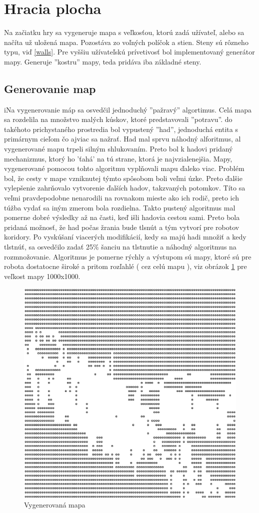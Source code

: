 \section{Hracia plocha} %
Na začiatku hry sa vygeneruje mapa s veľkosťou, ktorú zadá užívateľ, alebo sa načíta už uložená mapa. Pozostáva zo voľných políčok a stien. Steny sú rôzneho typu, viď \ref{walls}. Pre vyššiu užívateľskú prívetivosť bol implementovaný generátor mapy. Generuje ''kostru'' mapy, teda pridáva iba základné steny.
\subsection{Generovanie map}%
iNa vygenerovanie máp sa osvedčil jednoduchý ''pažravý'' algortimus. Celá mapa sa rozdelila na množstvo malých kúskov, ktoré predstavovali ''potravu''. do takéhoto prichystaného prostredia bol vypustený ''had'', jednoduchá entita s primárnym cieľom čo ajviac sa nažrať. Had mal sprvu náhodný alforitmus, al vygenerované mapu trpeli silným shlukovaním. Preto bol k hadovi pridaný mechanizmus, ktorý ho 'ťahá' na tú strane, ktorá je najvzialenejšia. Mapy, vygenerované pomocou tohto algoritmu vyplňovali mapu ďaleko viac. Problém bol, že cesty v mape vzniknutej týmto spôsobom boli veľmi úzke. Preto ďalšie vylepšenie zahrňovalo vytvorenie ďalších hadov, takzvaných potomkov. Títo sa veľmi pravdepodobne nenarodili na rovnakom mieste ako ich rodič, preto ich túžba vydať sa iným zmerom bola rozdielna. Takto pustený algoritmus mal pomerne dobré výsledky až na časti, keď išli hadovia cestou sami. Preto bola pridaná možnosť, že had počas žrania bude tlsnút a tým  vytvorí pre robotov koridory. Po vyskúšaní viacerých modifikácií, kedy sa majú hadi množiť a kedy tlstnúť, sa osvedčilo zadať 25\% šanciu na tlstnutie a náhodný algoritmus na rozmnožovanie. Algoritmus je pomerne rýchly a výstupom sú mapy, ktoré sú pre robota dostatocne široké a pritom rozľahlé ( cez celú mapu ), viz obrázok \ref{fig:mapa} pre veľkost mapy 1000x1000.
\begin{figure}
\centering
\includegraphics[totalheight=0.2\textheight,width=.6\textwidth]{mapa}
\caption {Vygenerovaná mapa}
\label{fig:mapa}
\end{figure}
